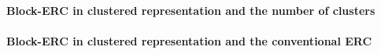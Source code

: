 \paragraph{Block-ERC in clustered representation and the number of clusters}

\paragraph{Block-ERC in clustered representation and the conventional ERC}

